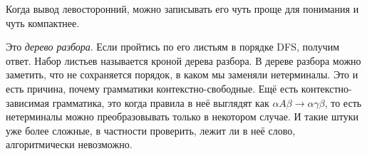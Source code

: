 \documentclass{article}
\begin{document}
\begin{itemize}
        \begin{Comment}
            Когда вывод левосторонний, можно записывать его чуть проще для понимания и чуть компактнее.
            \begin{figure}[H]
            \end{figure}\noindent
            Это \textit{дерево разбора}. Если пройтись по его листьям в порядке DFS, получим ответ. Набор листьев называется кроной дерева разбора. В дереве разбора можно заметить, что не сохраняется порядок, в каком мы заменяли нетерминалы. Это и есть причина, почему грамматики контекстно-свободные. Ещё есть контекстно-зависимая грамматика, это когда правила в неё выглядят как $\alpha A\beta\to\alpha\gamma\beta$, то есть нетерминалы можно преобразовывать только в некотором случае. И такие штуки уже более сложные, в частности проверить, лежит ли в неё слово, алгоритмически невозможно.
        \end{Comment}
        \begin{Example}

\end{Example}
\end{itemize}
\end{document}
